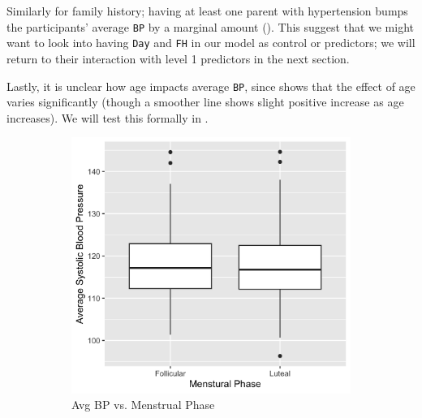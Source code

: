 \documentclass[12pt,twoside,letterpaper]{article}
\theoremstyle{definition}
\theoremstyle{definition}
\begin{document}
Similarly for family history; having at least one parent with hypertension bumps the participants' average \texttt{BP} by a marginal amount (). This suggest that we might want to look into having \texttt{Day} and \texttt{FH} in our model as control or predictors; we will return to their interaction with level 1 predictors in the next section. 

Lastly, it is unclear how age impacts average \texttt{BP}, since  shows that the effect of age varies significantly (though a smoother line shows slight positive increase as age increases). We will test this formally in .

\begin{figure} 
    \centering
    \begin{subfigure}{0.48\textwidth}
        \centering
        \includegraphics[width=\textwidth]{pics/bp v phase.png}
        \caption{{\small Avg BP vs. Menstrual Phase}}
        \label{fig: bp v phase}
    \end{subfigure}
    \hfill
    \begin{subfigure}{0.48\textwidth}
        \centering

\end{subfigure}
\end{figure}
\end{document}
